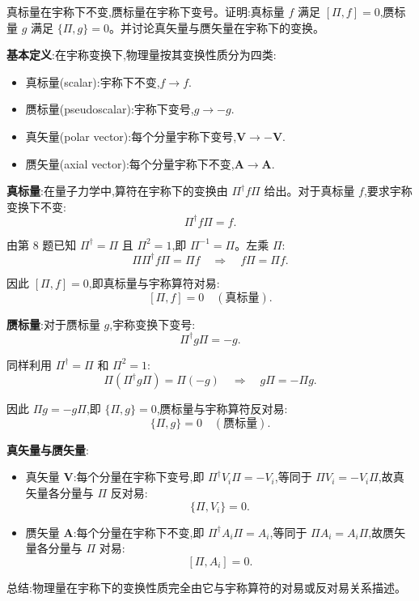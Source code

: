 \begin{question}
真标量在宇称下不变,赝标量在宇称下变号。证明:真标量 $f$ 满足 $[\Pi,f]=0$,赝标量 $g$ 满足 $\{\Pi,g\}=0$。并讨论真矢量与赝矢量在宇称下的变换。
\begin{solution}
	\textbf{基本定义}:在宇称变换下,物理量按其变换性质分为四类:
	\begin{itemize}
	\item 真标量(scalar):宇称下不变,$f\to f$.
	\item 赝标量(pseudoscalar):宇称下变号,$g\to -g$.
	\item 真矢量(polar vector):每个分量宇称下变号,$\mathbf V\to -\mathbf V$.
	\item 赝矢量(axial vector):每个分量宇称下不变,$\mathbf A\to \mathbf A$.
	\end{itemize}

	\textbf{真标量}:在量子力学中,算符在宇称下的变换由 $\Pi^\dagger f\Pi$ 给出。对于真标量 $f$,要求宇称变换下不变:
	\[
	\Pi^\dagger f\Pi = f.
	\]

	由第 8 题已知 $\Pi^\dagger=\Pi$ 且 $\Pi^2=1$,即 $\Pi^{-1}=\Pi$。左乘 $\Pi$:
	\[
	\Pi\Pi^\dagger f\Pi = \Pi f \quad\Longrightarrow\quad f\Pi = \Pi f.
	\]

	因此 $[\Pi, f]=0$,即真标量与宇称算符对易:
	\[
	\boxed{[\Pi,f]=0\quad(\text{真标量})}.
	\]

	\textbf{赝标量}:对于赝标量 $g$,宇称变换下变号:
	\[
	\Pi^\dagger g\Pi = -g.
	\]

	同样利用 $\Pi^\dagger=\Pi$ 和 $\Pi^2=1$:
	\[
	\Pi(\Pi^\dagger g\Pi)=\Pi(-g) \quad\Longrightarrow\quad g\Pi = -\Pi g.
	\]

	因此 $\Pi g = -g\Pi$,即 $\{\Pi,g\}=0$,赝标量与宇称算符反对易:
	\[
	\boxed{\{\Pi,g\}=0\quad(\text{赝标量})}.
	\]

	\textbf{真矢量与赝矢量}:
	\begin{itemize}
	\item 真矢量 $\mathbf V$:每个分量在宇称下变号,即 $\Pi^\dagger V_i\Pi = -V_i$,等同于 $\Pi V_i = -V_i\Pi$,故真矢量各分量与 $\Pi$ 反对易:
	\[
	\{\Pi,V_i\}=0.
	\]
	\item 赝矢量 $\mathbf A$:每个分量在宇称下不变,即 $\Pi^\dagger A_i\Pi = A_i$,等同于 $\Pi A_i = A_i\Pi$,故赝矢量各分量与 $\Pi$ 对易:
	\[
	[\Pi,A_i]=0.
	\]
	\end{itemize}

	总结:物理量在宇称下的变换性质完全由它与宇称算符的对易或反对易关系描述。
	\end{solution}
\end{question}

